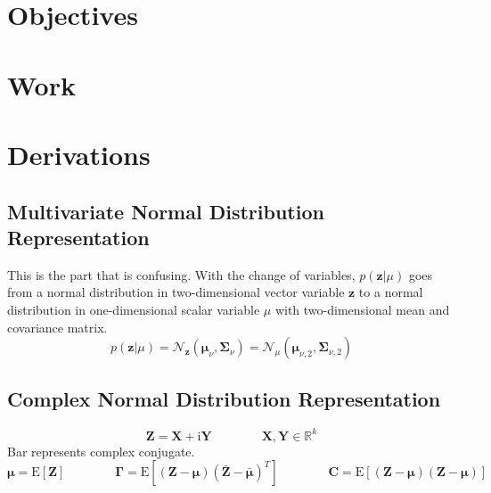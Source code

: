 \documentclass{article}         %
\theoremstyle{definition}
\theoremstyle{remark}
\newcommand{\eq}[1]{\begin{equation} #1 \end{equation}}
\newcommand{\R}{\mathbb{R}}
\newcommand{\Xbf}{\mathbf{X}}
\newcommand{\Ybf}{\mathbf{Y}}
\newcommand{\zbf}{\mathbf{z}}
\newcommand{\Zbf}{\mathbf{Z}}
\newcommand{\mubf}{\boldsymbol{\mu}}
\newcommand{\Gammabf}{\mathbf{\Gamma}}
\newcommand{\Cbf}{\mathbf{C}}
\newcommand{\Sigmabf}{\boldsymbol{\Sigma}}
\newcommand{\zcond}{\mathbf{z}|\mu}
\newcommand{\Nscript}{\mathcal{N}}
\newcommand{\im}{\mathrm{i}}
\newcommand{\paren}[1]{\left(#1\right)}
\newcommand{\expect}[1]{\mathrm{E}\left[#1\right]}
\newcommand{\qq}{\qquad\qquad}
\begin{document}

\section{Objectives}\label{Objectives}



\section{Work}\label{Work}



\section{Derivations}\label{Derivations}

\subsection{Multivariate Normal Distribution Representation}

This is the part that is confusing. With the change of variables, $p\paren{\zcond}$ goes from a normal distribution in two-dimensional vector variable $\zbf$ to a normal distribution in one-dimensional scalar variable $\mu$ with two-dimensional mean and covariance matrix.
\eq{p\paren{\zcond} = \Nscript_\zbf\paren{\mubf_\nu,\Sigmabf_\nu} = \Nscript_\mu\paren{\mubf_{\nu,2},\Sigmabf_{\nu,2}}}

\subsection{Complex Normal Distribution Representation}

\begin{equation}
	\Zbf = \Xbf + \im\Ybf
	\qq \Xbf,\Ybf\in\R^k
\end{equation}
Bar represents complex conjugate.
\begin{equation}
	\mubf = \expect{\Zbf}
	\qq \Gammabf = \expect{\paren{\Zbf - \mubf}\paren{\bar{\Zbf} - \bar{\mubf}}^T}
	\qq \Cbf = \expect{\paren{\Zbf - \mubf}\paren{\Zbf - \mubf}}
\end{equation}
\end{document}
